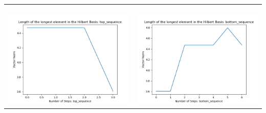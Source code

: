 \documentclass[10pt]{article}
\begin{document}
\begin{tabular}{c|c}
\begin{minipage}{.45\textwidth}
\end{minipage} \\ \\
\hline \\\begin{minipage}{.45\textwidth}
\includegraphics[width=\textwidth]{"DATA/4d/4 generators 2 bound J/top_sequence LENGTH"}
\end{minipage} &
\begin{minipage}{.45\textwidth}
\includegraphics[width=\textwidth]{"DATA/4d/4 generators 2 bound J bottomup/bottom_sequence LENGTH"}
\end{minipage}
\end{tabular}
\end{document}
